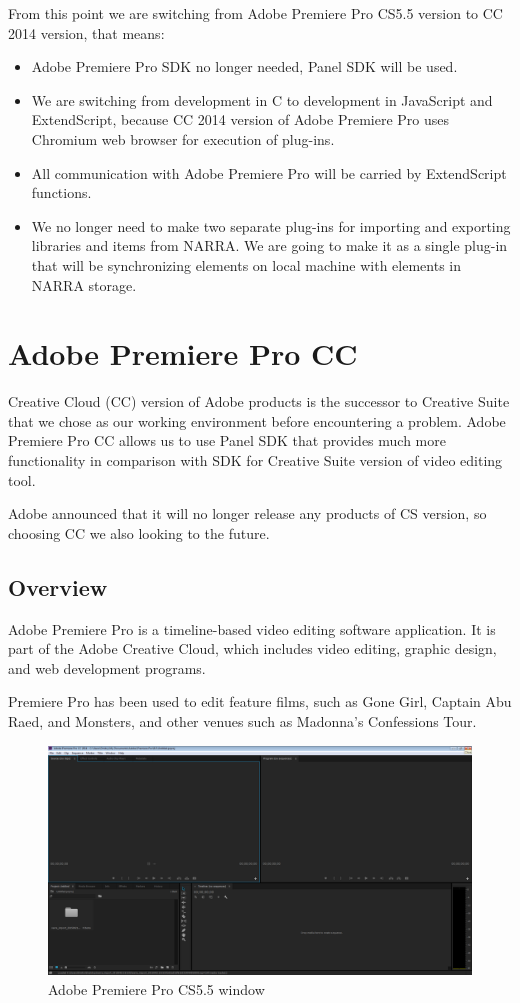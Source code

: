 \documentclass[thesis=B,english]{FITthesis}[2012/10/20]
\begin{document}
From this point we are switching from Adobe Premiere Pro CS5.5 version to CC 2014 version, that means:
	\begin{itemize}
		\item Adobe Premiere Pro SDK no longer needed, Panel SDK will be used.
		\item We are switching from development in C to development in JavaScript and ExtendScript, because CC 2014 version of Adobe Premiere Pro uses Chromium web browser for execution of plug-ins.
		\item All communication with Adobe Premiere Pro will be carried by ExtendScript functions.
		\item We no longer need to make two separate plug-ins for importing and exporting libraries and items from NARRA. We are going to make it as a single plug-in that will be synchronizing elements on local machine with elements in NARRA storage. 
	\end{itemize}
\section{Adobe Premiere Pro CC}
Creative Cloud (CC) version of Adobe products is the successor to Creative Suite that we chose as our working environment before encountering a problem. Adobe Premiere Pro CC allows us to use Panel SDK that provides much more functionality in comparison with SDK for Creative Suite version of video editing tool. 

Adobe announced that it will no longer release any products of CS version\cite{CC}, so choosing CC we also looking to the future. 

\subsection{Overview}
Adobe Premiere Pro is a timeline-based video editing software application. It is part of the Adobe Creative Cloud, which includes video editing, graphic design, and web development programs.

Premiere Pro has been used to edit feature films, such as Gone Girl, Captain Abu Raed, and Monsters, and other venues such as Madonna's Confessions Tour.\cite{adobe}
	\begin{figure}
		\centering
		\includegraphics[width=1.1\textwidth]{PremiereMain.png}
		\caption{Adobe Premiere Pro CS5.5 window}\label{fig:APPWindow}
	\end{figure}
\end{document}
